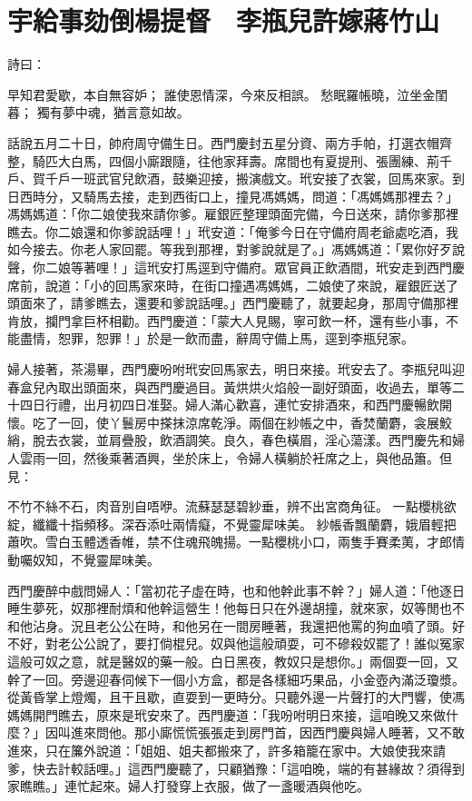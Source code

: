 %

\chapter{宇給事劾倒楊提督　李瓶兒許嫁蔣竹山}

詩曰：

早知君愛歇，本自無容妒；
誰使恩情深，今來反相誤。
愁眠羅帳曉，泣坐金閨暮；
獨有夢中魂，猶言意如故。

話說五月二十日，帥府周守備生日。西門慶封五星分資、兩方手帕，打選衣帽齊整，騎匹大白馬，四個小廝跟隨，往他家拜壽。席間也有夏提刑、張團練、荊千戶、賀千戶一班武官兒飲酒，鼓樂迎接，搬演戲文。玳安接了衣裳，回馬來家。到日西時分，又騎馬去接，走到西街口上，撞見馮媽媽，問道：「馮媽媽那裡去？」馮媽媽道：「你二娘使我來請你爹。雇銀匠整理頭面完備，今日送來，請你爹那裡瞧去。你二娘還和你爹說話哩！」玳安道：「俺爹今日在守備府周老爺處吃酒，我如今接去。你老人家回罷。等我到那裡，對爹說就是了。」馮媽媽道：「累你好歹說聲，你二娘等著哩！」這玳安打馬逕到守備府。眾官員正飲酒間，玳安走到西門慶席前，說道：「小的回馬家來時，在街口撞遇馮媽媽，二娘使了來說，雇銀匠送了頭面來了，請爹瞧去，還要和爹說話哩。」西門慶聽了，就要起身，那周守備那裡肯放，攔門拿巨杯相勸。西門慶道：「蒙大人見賜，寧可飲一杯，還有些小事，不能盡情，恕罪，恕罪！」於是一飲而盡，辭周守備上馬，逕到李瓶兒家。

婦人接著，茶湯畢，西門慶吩咐玳安回馬家去，明日來接。玳安去了。李瓶兒叫迎春盒兒內取出頭面來，與西門慶過目。黃烘烘火焰般一副好頭面，收過去，單等二十四日行禮，出月初四日准娶。婦人滿心歡喜，連忙安排酒來，和西門慶暢飲開懷。吃了一回，使丫鬟房中搽抹涼席乾淨。兩個在紗帳之中，香焚蘭麝，衾展鮫綃，脫去衣裳，並肩疊股，飲酒調笑。良久，春色橫眉，淫心蕩漾。西門慶先和婦人雲雨一回，然後乘著酒興，坐於床上，令婦人橫躺於衽席之上，與他品簫。但見：

不竹不絲不石，肉音別自唔咿。流蘇瑟瑟碧紗垂，辨不出宮商角征。 一點櫻桃欲綻，纖纖十指頻移。深吞添吐兩情癡，不覺靈犀味美。
紗帳香飄蘭麝，娥眉輕把蕭吹。雪白玉體透香帷，禁不住魂飛魄揚。一點櫻桃小口，兩隻手賽柔荑，才郎情動囑奴知，不覺靈犀味美。

西門慶醉中戲問婦人：「當初花子虛在時，也和他幹此事不幹？」婦人道：「他逐日睡生夢死，奴那裡耐煩和他幹這營生！他每日只在外邊胡撞，就來家，奴等閒也不和他沾身。況且老公公在時，和他另在一間房睡著，我還把他罵的狗血噴了頭。好不好，對老公公說了，要打倘棍兒。奴與他這般頑耍，可不磣殺奴罷了！誰似冤家這般可奴之意，就是醫奴的藥一般。白日黑夜，教奴只是想你。」兩個耍一回，又幹了一回。旁邊迎春伺候下一個小方盒，都是各樣細巧果品，小金壺內滿泛瓊漿。從黃昏掌上燈燭，且干且歇，直耍到一更時分。只聽外邊一片聲打的大門響，使馮媽媽開門瞧去，原來是玳安來了。西門慶道：「我吩咐明日來接，這咱晚又來做什麼？」因叫進來問他。那小廝慌慌張張走到房門首，因西門慶與婦人睡著，又不敢進來，只在簾外說道：「姐姐、姐夫都搬來了，許多箱籠在家中。大娘使我來請爹，快去計較話哩。」這西門慶聽了，只顧猶豫：「這咱晚，端的有甚緣故？須得到家瞧瞧。」連忙起來。婦人打發穿上衣服，做了一盞暖酒與他吃。


